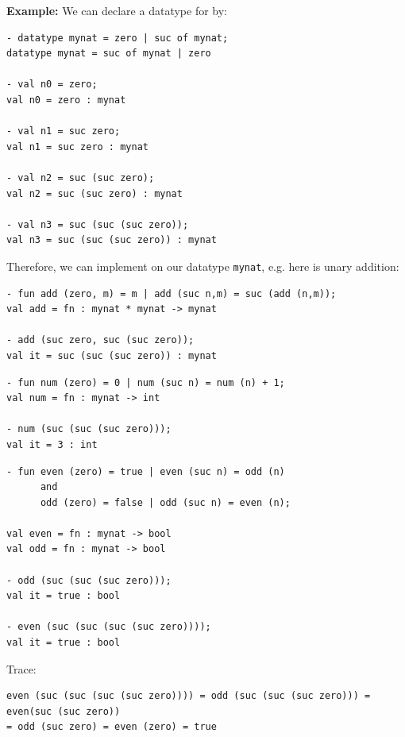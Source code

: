 
\textbf{Example: }We can declare a datatype for  by:
\begin{verbatim}
- datatype mynat = zero | suc of mynat;
datatype mynat = suc of mynat | zero

- val n0 = zero;
val n0 = zero : mynat

- val n1 = suc zero;
val n1 = suc zero : mynat

- val n2 = suc (suc zero);
val n2 = suc (suc zero) : mynat

- val n3 = suc (suc (suc zero));
val n3 = suc (suc (suc zero)) : mynat
\end{verbatim}

Therefore, we can implement  on our datatype \texttt{mynat}, e.g. here is unary addition:
\begin{verbatim}
- fun add (zero, m) = m | add (suc n,m) = suc (add (n,m));
val add = fn : mynat * mynat -> mynat

- add (suc zero, suc (suc zero));
val it = suc (suc (suc zero)) : mynat
\end{verbatim}

\begin{verbatim}
- fun num (zero) = 0 | num (suc n) = num (n) + 1;
val num = fn : mynat -> int

- num (suc (suc (suc zero)));
val it = 3 : int
\end{verbatim}

\begin{verbatim}
- fun even (zero) = true | even (suc n) = odd (n)
      and
      odd (zero) = false | odd (suc n) = even (n);

val even = fn : mynat -> bool
val odd = fn : mynat -> bool

- odd (suc (suc (suc zero)));
val it = true : bool

- even (suc (suc (suc (suc zero))));
val it = true : bool
\end{verbatim}
Trace:
\begin{verbatim}
even (suc (suc (suc (suc zero)))) = odd (suc (suc (suc zero))) = even(suc (suc zero))
= odd (suc zero) = even (zero) = true
\end{verbatim}


